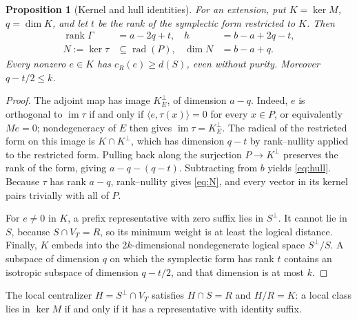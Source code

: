 \documentclass[11pt]{article}
\newtheorem{proposition}[theorem]{Proposition}
\theoremstyle{definition}
\theoremstyle{remark}
\newcommand{\cost}{c_R}
\newcommand{\rank}{\operatorname{rank}}
\newcommand{\rad}{\operatorname{rad}}
\newcommand{\im}{\operatorname{im}}
\begin{document}
\begin{proposition}[Kernel and hull identities]\label{prop:kernel}
For an extension, put \(K=\ker M\), \(q=\dim K\), and let \(t\) be the
rank of the symplectic form restricted to \(K\). Then
\begin{align}
 \rank\Gamma&=a-2q+t,&
 h&=b-a+2q-t,\label{eq:hull}\\
 N:=\ker\tau&\subseteq\rad(P),&
 \dim N&=b-a+q.\label{eq:N}
\end{align}
Every nonzero \(e\in K\) has \(\cost(e)\geq d(S)\), even without
purity. Moreover \(q-t/2\leq k\).
\end{proposition}
\begin{proof}
The adjoint map has image \(K^\perp_E\), of dimension \(a-q\). Indeed,
\(e\) is orthogonal to \(\im\tau\) if and only if
\(\langle e,\tau(x)\rangle=0\) for every \(x\in P\), or equivalently
\(Me=0\); nondegeneracy of \(E\) then gives \(\im\tau=K^\perp_E\). The
radical of the restricted form on this image is \(K\cap K^\perp\), which
has dimension \(q-t\) by rank--nullity applied to the restricted form.
Pulling back along the surjection \(P\to K^\perp\) preserves the rank of
the form, giving \(a-q-(q-t)\). Subtracting from \(b\) yields
\eqref{eq:hull}. Because \(\tau\) has rank \(a-q\), rank--nullity gives
\eqref{eq:N}, and every vector in its kernel pairs trivially with all of
\(P\).

For \(e\ne0\) in \(K\), a prefix representative with zero suffix lies in
\(S^\perp\). It cannot lie in \(S\), because \(S\cap V_T=R\), so its
minimum weight is at least the logical distance. Finally, \(K\) embeds
into the \(2k\)-dimensional nondegenerate logical space \(S^\perp/S\). A
subspace of dimension \(q\) on which the symplectic form has rank \(t\)
contains an isotropic subspace of dimension \(q-t/2\), and that
dimension is at most \(k\).
\end{proof}

The local centralizer \(H=S^\perp\cap V_T\) satisfies \(H\cap S=R\) and
\(H/R=K\): a local class lies in \(\ker M\) if and only if it has a
representative with identity suffix.
\end{document}

